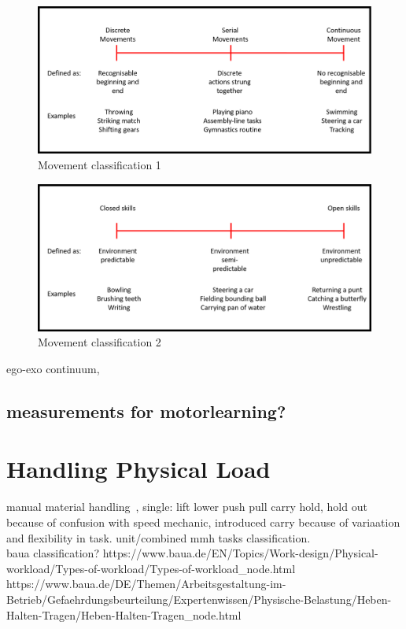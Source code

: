 \begin{figure}[htb]
	\centering
	\includegraphics[width=\textwidth]{figures/movement_classification.png}
	\caption[Movement classification 1]{Movement classification 1}
	\label{fig:movement_classification}
\end{figure}

\begin{figure}[htb]
	\centering
	\includegraphics[width=\textwidth]{figures/movement_classification2.png}
	\caption[Movement classification 2]{Movement classification 2}
	\label{fig:movement_classification2}
\end{figure}

ego-exo continuum,
\subsection{measurements for motorlearning?}
\section{Handling Physical Load}
manual material handling~\cite{mmh}, single: lift lower push pull carry hold, hold out because of confusion with speed mechanic, introduced carry because of variaation and flexibility in task. unit/combined mmh tasks classification.\\
baua classification?
https://www.baua.de/EN/Topics/Work-design/Physical-workload/Types-of-workload/Types-of-workload_node.html https://www.baua.de/DE/Themen/Arbeitsgestaltung-im-Betrieb/Gefaehrdungsbeurteilung/Expertenwissen/Physische-Belastung/Heben-Halten-Tragen/Heben-Halten-Tragen_node.html
